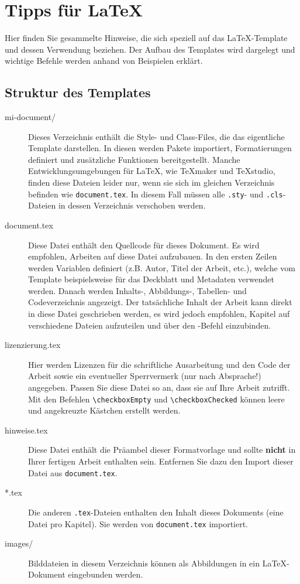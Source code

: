\chapter{Tipps für \LaTeX}\label{latex}

Hier finden Sie gesammelte Hinweise, die sich speziell auf das \LaTeX-Template und dessen Verwendung beziehen. Der Aufbau des Templates wird dargelegt und wichtige Befehle werden anhand von Beispielen erklärt.

\section{Struktur des Templates}

\begin{description}
    \item[mi-document/]{Dieses Verzeichnis enthält die Style- und Class-Files, die das eigentliche Template darstellen. In diesen werden Pakete importiert, Formatierungen definiert und zusätzliche Funktionen bereitgestellt. Manche Entwicklungsumgebungen für \LaTeX, wie TeXmaker und TeXstudio, finden diese Dateien leider nur, wenn sie sich im gleichen Verzeichnis befinden wie \verb|document.tex|. In diesem Fall müssen alle \verb|.sty|- und \verb|.cls|-Dateien in dessen Verzeichnis verschoben werden.}
    \item[document.tex]{Diese Datei enthält den Quellcode für dieses Dokument. Es wird empfohlen, Arbeiten auf diese Datei aufzubauen. In den ersten Zeilen werden Variablen definiert (z.B. Autor, Titel der Arbeit, etc.), welche vom Template beispielsweise für das Deckblatt und Metadaten verwendet werden. Danach werden Inhalts-, Abbildungs-, Tabellen- und Codeverzeichnis angezeigt. Der tatsächliche Inhalt der Arbeit kann direkt in diese Datei geschrieben werden, es wird jedoch empfohlen, Kapitel auf verschiedene Dateien aufzuteilen und über den \verb||-Befehl einzubinden.}
    \item[lizenzierung.tex]{Hier werden Lizenzen für die schriftliche Ausarbeitung und den Code der Arbeit sowie ein eventueller Sperrvermerk (nur nach Absprache!) angegeben. Passen Sie diese Datei so an, dass sie auf Ihre Arbeit zutrifft. Mit den Befehlen \verb|\checkboxEmpty| und \verb|\checkboxChecked| können leere und angekreuzte Kästchen erstellt werden.}
    \item[hinweise.tex]{Diese Datei enthält die Präambel dieser Formatvorlage und sollte \textbf{nicht} in Ihrer fertigen Arbeit enthalten sein. Entfernen Sie dazu den Import dieser Datei aus \verb|document.tex|.}
    \item[*.tex]{Die anderen \verb|.tex|-Dateien enthalten den Inhalt dieses Dokuments (eine Datei pro Kapitel). Sie werden von \verb|document.tex| importiert.}
    \item[images/]{Bilddateien in diesem Verzeichnis können als Abbildungen in ein \LaTeX-Dokument eingebunden werden.}
\end{description}

